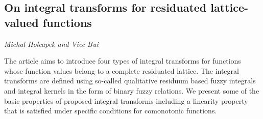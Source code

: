 \documentclass[../booklet.tex]{subfiles}
\begin{document}
\subsection[On integral transforms for residuated lattice-valued functions. {\it Michal Holcapek and Viec Bui}]{On integral transforms for residuated lattice-valued functions}
 

\begin{center}
  {\it Michal Holcapek and Viec Bui}
\end{center}



The article aims to introduce four types of integral transforms for functions whose function values belong to a complete residuated lattice. The integral transforms are defined using so-called qualitative residuum based fuzzy integrals and integral kernels in the form of binary fuzzy relations. We present some of the basic properties of proposed integral transforms including a linearity property that is satisfied under specific conditions for comonotonic functions. 

\end{document}
